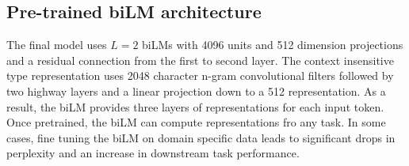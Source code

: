 \subsection{Pre-trained biLM architecture}

The final model uses $L=2$ biLMs with 4096 units and 512 dimension projections
and a residual connection from the first to second layer. The context
insensitive type representation uses 2048 character n-gram convolutional filters
followed by two highway layers and a linear projection down to a 512
representation. As a result, the biLM provides three layers of representations
for each input token.\\
Once pretrained, the biLM can compute representations fro any task. In some
cases, fine tuning the biLM on domain specific data leads to significant drops
in perplexity and an increase in downstream task performance.
